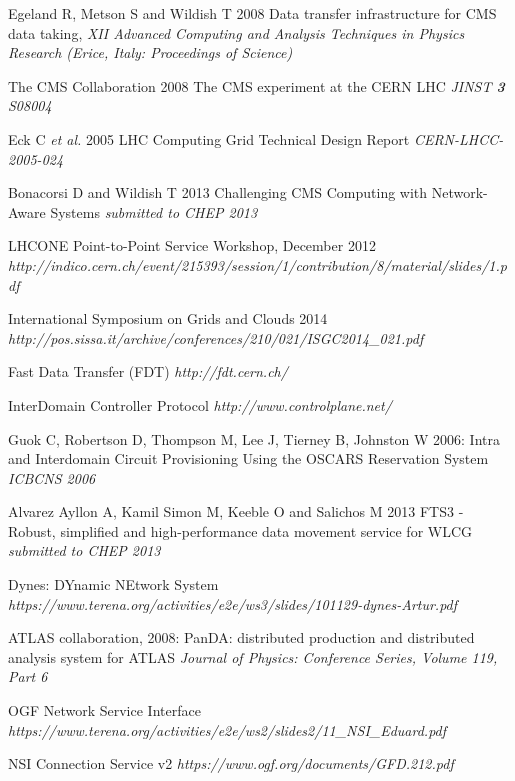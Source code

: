 \begin{thebibliography}{1}

 Egeland R, Metson S and Wildish T 2008 Data transfer infrastructure for CMS data taking,  {\it XII Advanced Computing and Analysis Techniques in Physics Research (Erice, Italy: Proceedings of Science)}

 The CMS Collaboration 2008 The CMS experiment at the CERN LHC {\it JINST {\bf 3} S08004}

 Eck C {\it et al.} 2005 LHC Computing Grid Technical Design Report {\it CERN-LHCC-2005-024}

 Bonacorsi D and Wildish T 2013 Challenging CMS Computing with Network-Aware Systems {\it submitted to CHEP 2013}
 
 LHCONE Point-to-Point Service Workshop, December 2012 
 {\it http://indico.cern.ch/event/215393/session/1/contribution/8/material/slides/1.pdf}
 
International Symposium on Grids and Clouds 2014 {\it http://pos.sissa.it/archive/conferences/210/021/ISGC2014\_021.pdf}

 Fast Data Transfer (FDT) {\it http://fdt.cern.ch/}

 InterDomain Controller Protocol {\it http://www.controlplane.net/}

  Guok C, Robertson D, Thompson M, Lee J, Tierney B, Johnston W 2006: Intra and Interdomain Circuit Provisioning Using the OSCARS Reservation System {\it ICBCNS 2006}

 Alvarez Ayllon A, Kamil Simon M, Keeble O and Salichos M 2013 FTS3 - Robust, simplified and high-performance data movement service for WLCG {\it submitted to CHEP 2013}

 Dynes: DYnamic NEtwork System {\it https://www.terena.org/activities/e2e/ws3/slides/101129-dynes-Artur.pdf}

  ATLAS collaboration, 2008: PanDA: distributed production and distributed analysis system for ATLAS {\it Journal of Physics: Conference Series, Volume 119, Part 6}
 
 OGF Network Service Interface {\it https://www.terena.org/activities/e2e/ws2/slides2/11\_NSI\_Eduard.pdf}

 NSI Connection Service v2 {\it https://www.ogf.org/documents/GFD.212.pdf}

\end{thebibliography}
